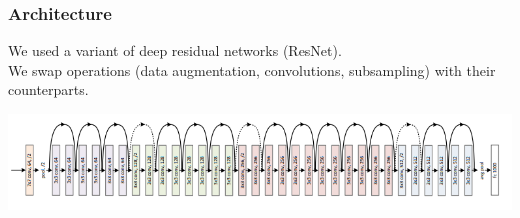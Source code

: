 \documentclass[t,9pt,pdftex]{beamer}
\theoremstyle{definition}
\begin{document}
      



      


    

\begin{frame}[c, label=current]
  \frametitle{Architecture}
  We used a variant of deep residual networks (ResNet).\\
  We swap operations (data augmentation, convolutions, subsampling) with their counterparts.
  \begin{center}
  \includegraphics[width=\textwidth,height=\textheight,keepaspectratio]{resnet.png}
  \end{center}
\end{frame}
\end{document}
